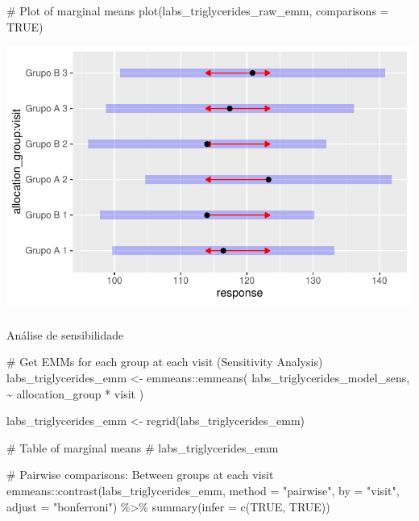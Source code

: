\documentclass[
  12pt,
]{article}
\makeatletter
\let\oldsubparagraph\subparagraph
\renewcommand{\subparagraph}{
    \@ifstar
      \xxxSubParagraphStar
      \xxxSubParagraphNoStar
  }
\newcommand{\xxxSubParagraphStar}[1]{\oldsubparagraph*{#1}\mbox{}}
\newcommand{\xxxSubParagraphNoStar}[1]{\oldsubparagraph{#1}\mbox{}}
\newenvironment{Shaded}{\begin{snugshade}}{\end{snugshade}}
\newcommand{\AttributeTok}[1]{\textcolor[rgb]{0.40,0.45,0.13}{#1}}
\newcommand{\CommentTok}[1]{\textcolor[rgb]{0.37,0.37,0.37}{#1}}
\newcommand{\ConstantTok}[1]{\textcolor[rgb]{0.56,0.35,0.01}{#1}}
\newcommand{\FunctionTok}[1]{\textcolor[rgb]{0.28,0.35,0.67}{#1}}
\newcommand{\NormalTok}[1]{\textcolor[rgb]{0.00,0.23,0.31}{#1}}
\newcommand{\OtherTok}[1]{\textcolor[rgb]{0.00,0.23,0.31}{#1}}
\newcommand{\SpecialCharTok}[1]{\textcolor[rgb]{0.37,0.37,0.37}{#1}}
\newcommand{\StringTok}[1]{\textcolor[rgb]{0.13,0.47,0.30}{#1}}
\makeatother
\begin{document}
\begin{Shaded}
\begin{Highlighting}[]
\CommentTok{\# Plot of marginal means}
\FunctionTok{plot}\NormalTok{(labs\_triglycerides\_raw\_emm, }\AttributeTok{comparisons =} \ConstantTok{TRUE}\NormalTok{)}
\end{Highlighting}
\end{Shaded}

\includegraphics{Outcomes_files/figure-pdf/labs_triglycerides_raw_emm-1.pdf}

\subparagraph{Análise de
sensibilidade}\label{anuxe1lise-de-sensibilidade-7}

\begin{Shaded}
\begin{Highlighting}[]
\CommentTok{\# Get EMMs for each group at each visit (Sensitivity Analysis)}
\NormalTok{labs\_triglycerides\_emm }\OtherTok{\textless{}{-}}\NormalTok{ emmeans}\SpecialCharTok{::}\FunctionTok{emmeans}\NormalTok{(}
\NormalTok{    labs\_triglycerides\_model\_sens, }
    \SpecialCharTok{\textasciitilde{}}\NormalTok{ allocation\_group }\SpecialCharTok{*}\NormalTok{ visit}
\NormalTok{)}

\NormalTok{labs\_triglycerides\_emm }\OtherTok{\textless{}{-}} \FunctionTok{regrid}\NormalTok{(labs\_triglycerides\_emm)}

\CommentTok{\# Table of marginal means}
\CommentTok{\# labs\_triglycerides\_emm}

\CommentTok{\# Pairwise comparisons: Between groups at each visit}
\NormalTok{emmeans}\SpecialCharTok{::}\FunctionTok{contrast}\NormalTok{(labs\_triglycerides\_emm,}
\AttributeTok{method =} \StringTok{"pairwise"}\NormalTok{, }\AttributeTok{by =} \StringTok{"visit"}\NormalTok{,}
\AttributeTok{adjust =} \StringTok{"bonferroni"}\NormalTok{) }\SpecialCharTok{\%\textgreater{}\%} \FunctionTok{summary}\NormalTok{(}\AttributeTok{infer =} \FunctionTok{c}\NormalTok{(}\ConstantTok{TRUE}\NormalTok{, }\ConstantTok{TRUE}\NormalTok{))}
\end{Highlighting}
\end{Shaded}
\end{document}
